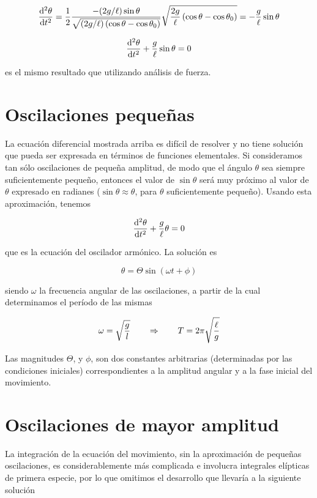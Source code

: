 \documentclass[12pt,spanish]{article}
\begin{document}
    \[\frac{\mathrm d^2 \theta}{\mathrm d t^2} = {1\over 2}{-(2g/\ell) \sin\theta\over\sqrt{(2g/\ell) \left(\cos\theta-\cos\theta_0\right)}}\sqrt{{2g\over \ell} \left(\cos\theta-\cos\theta_0\right)} = -{g\over \ell}\sin\theta\]
    
    
    \[\frac{\mathrm d^2 \theta}{\mathrm d t^2} + {g\over \ell}\sin\theta = 0\]

es el mismo resultado que utilizando análisis de fuerza.

\section{Oscilaciones pequeñas}

La ecuación diferencial mostrada arriba es difícil de resolver y no tiene solución que pueda ser expresada en términos de funciones elementales. Si consideramos tan sólo oscilaciones de pequeña amplitud, de modo que el ángulo $\theta$ sea siempre suficientemente pequeño, entonces el valor de $\sin\theta$ será muy próximo al valor de $\theta$ expresado en radianes ($\sin\theta \approx \theta$, para $\theta$ suficientemente pequeño). Usando esta aproximación, tenemos

    \[\frac{\mathrm d^2 \theta}{\mathrm d t^2} + {g\over \ell} \theta = 0\]
    
que es la ecuación del oscilador armónico. La solución es

    \[\theta = \Theta\sin(\omega t + \phi) \]

siendo $\omega$ la frecuencia angular de las oscilaciones, a partir de la cual determinamos el período de las mismas

    \[\omega = \sqrt{g \over l} \qquad\Rightarrow\qquad T = 2\pi\sqrt{\ell \over g}\]
    
Las magnitudes $\Theta$, y $\phi$, son dos constantes arbitrarias (determinadas por las condiciones iniciales) correspondientes a la amplitud angular y a la fase inicial del movimiento.

\section{Oscilaciones de mayor amplitud}

La integración de la ecuación del movimiento, sin la aproximación de pequeñas oscilaciones, es considerablemente más complicada e involucra integrales elípticas de primera especie, por lo que omitimos el desarrollo que llevaría a la siguiente solución \cite{nel}
\end{document}
